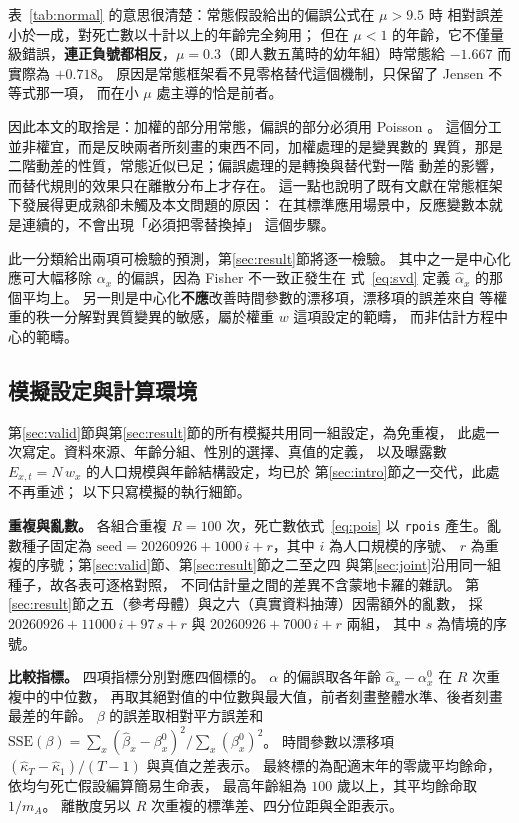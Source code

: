 \documentclass[UTF8, fontset=macnew, a4paper, 12pt]{ctexart}
\begin{document}
表~\ref{tab:normal} 的意思很清楚：常態假設給出的偏誤公式在 $\mu>9.5$ 時
相對誤差小於一成，對死亡數以十計以上的年齡完全夠用；
但在 $\mu<1$ 的年齡，它不僅量級錯誤，\textbf{連正負號都相反}，$\mu=0.3$（即人數五萬時的幼年組）時常態給 $-1.667$ 而實際為 $+0.718$。
原因是常態框架看不見零格替代這個機制，只保留了 Jensen 不等式那一項，
而在小 $\mu$ 處主導的恰是前者。

因此本文的取捨是：加權的部分用常態，偏誤的部分必須用 Poisson 。
這個分工並非權宜，而是反映兩者所刻畫的東西不同，加權處理的是變異數的
異質，那是二階動差的性質，常態近似已足；偏誤處理的是轉換與替代對一階
動差的影響，而替代規則的效果只在離散分布上才存在。
這一點也說明了既有文獻在常態框架下發展得更成熟卻未觸及本文問題的原因：
在其標準應用場景中，反應變數本就是連續的，不會出現「必須把零替換掉」
這個步驟。

此一分類給出兩項可檢驗的預測，第\ref{sec:result}節將逐一檢驗。
其中之一是中心化應可大幅移除 $\alpha_x$ 的偏誤，因為 Fisher 不一致正發生在
式~\eqref{eq:svd} 定義 $\hat\alpha_x$ 的那個平均上。
另一則是中心化\textbf{不應}改善時間參數的漂移項，漂移項的誤差來自
等權重的秩一分解對異質變異的敏感，屬於權重 $w$ 這項設定的範疇，
而非估計方程中心的範疇。

\subsection{模擬設定與計算環境}\label{sec:setup}

第\ref{sec:valid}節與第\ref{sec:result}節的所有模擬共用同一組設定，為免重複，
此處一次寫定。資料來源、年齡分組、性別的選擇、真值的定義，
以及曝露數 $E_{x,t}=N\,w_x$ 的人口規模與年齡結構設定，均已於
第\ref{sec:intro}節之一交代，此處不再重述；
以下只寫模擬的執行細節。

\textbf{重複與亂數。} 各組合重複 $R=100$ 次，死亡數依式~\eqref{eq:pois}
以 \texttt{rpois} 產生。亂數種子固定為
$\text{seed}=20260926+1000\,i+r$，其中 $i$ 為人口規模的序號、
$r$ 為重複的序號；第\ref{sec:valid}節、第\ref{sec:result}節之二至之四
與第\ref{sec:joint}沿用同一組種子，故各表可逐格對照，
不同估計量之間的差異不含蒙地卡羅的雜訊。
第\ref{sec:result}節之五（參考母體）與之六（真實資料抽薄）因需額外的亂數，
採 $20260926+11000\,i+97\,s+r$ 與 $20260926+7000\,i+r$ 兩組，
其中 $s$ 為情境的序號。

\textbf{比較指標。} 四項指標分別對應四個標的。
$\alpha$ 的偏誤取各年齡 $\hat\alpha_x-\alpha^{0}_x$ 在 $R$ 次重複中的中位數，
再取其絕對值的中位數與最大值，前者刻畫整體水準、後者刻畫最差的年齡。
$\beta$ 的誤差取相對平方誤差和
$\mathrm{SSE}(\beta)=\sum_x(\hat\beta_x-\beta^{0}_x)^2\big/\sum_x(\beta^{0}_x)^2$。
時間參數以漂移項 $(\hat\kappa_T-\hat\kappa_1)/(T-1)$ 與真值之差表示。
最終標的為配適末年的零歲平均餘命，依均勻死亡假設編算簡易生命表，
最高年齡組為 $100$ 歲以上，其平均餘命取 $1/m_{A}$。
離散度另以 $R$ 次重複的標準差、四分位距與全距表示。
\end{document}
